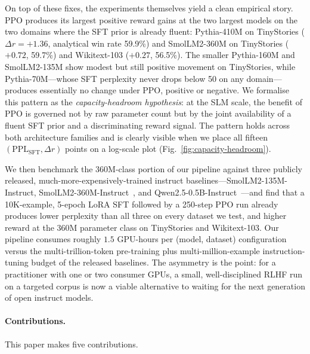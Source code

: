 \documentclass[10pt,twocolumn,letterpaper]{article}
\begin{document}
On top of these fixes, the experiments themselves yield a clean empirical story. PPO produces its largest positive reward gains at the two largest models on the two domains where the SFT prior is already fluent: Pythia-410M on TinyStories ($\Delta r = +1.36$, analytical win rate 59.9\%) and SmolLM2-360M on TinyStories ($+0.72$, 59.7\%) and Wikitext-103 ($+0.27$, 56.5\%). The smaller Pythia-160M and SmolLM2-135M show modest but still positive movement on TinyStories, while Pythia-70M---whose SFT perplexity never drops below 50 on any domain---produces essentially no change under PPO, positive or negative. We formalise this pattern as the \emph{capacity-headroom hypothesis}: at the SLM scale, the benefit of PPO is governed not by raw parameter count but by the joint availability of a fluent SFT prior and a discriminating reward signal. The pattern holds across both architecture families and is clearly visible when we place all fifteen $(\text{PPL}_{\text{SFT}}, \Delta r)$ points on a log-scale plot (Fig.~\ref{fig:capacity-headroom}).

We then benchmark the 360M-class portion of our pipeline against three publicly released, much-more-expensively-trained instruct baselines---SmolLM2-135M-Instruct, SmolLM2-360M-Instruct~\cite{allal2025smollm2}, and Qwen2.5-0.5B-Instruct~\cite{qwen2025technical}---and find that a 10K-example, 5-epoch LoRA SFT followed by a 250-step PPO run already produces lower perplexity than all three on every dataset we test, and higher reward at the 360M parameter class on TinyStories and Wikitext-103. Our pipeline consumes roughly $1.5$ GPU-hours per (model, dataset) configuration versus the multi-trillion-token pre-training plus multi-million-example instruction-tuning budget of the released baselines. The asymmetry is the point: for a practitioner with one or two consumer GPUs, a small, well-disciplined RLHF run on a targeted corpus is now a viable alternative to waiting for the next generation of open instruct models.

\paragraph{Contributions.}
This paper makes five contributions.
\end{document}
